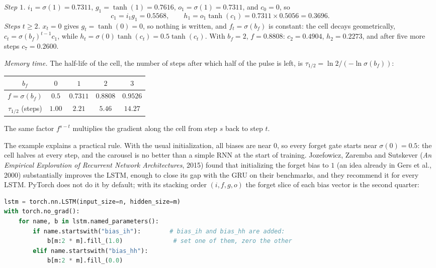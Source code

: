 \begin{notechapter}
\begin{example}
\emph{Step $1$.} $i_1 = \sigma(1) = 0.7311$, $g_1 = \tanh(1) = 0.7616$, $o_1 = \sigma(1) = 0.7311$, and $c_0 = 0$, so
\[
  c_1 = i_1g_1 = 0.5568,\qquad h_1 = o_1\tanh(c_1) = 0.7311\times0.5056 = 0.3696 .
\]
\emph{Steps $t\geq2$.} $x_t = 0$ gives $g_t = \tanh(0) = 0$, so nothing is written, and $f_t = \sigma(b_f)$ is constant: the cell
decays geometrically, $c_t = \sigma(b_f)^{t-1}c_1$, while $h_t = \sigma(0)\tanh(c_t) = 0.5\tanh(c_t)$. With $b_f = 2$, $f = 0.8808$:
$c_2 = 0.4904$, $h_2 = 0.2273$, and after five more steps $c_7 = 0.2600$.

\emph{Memory time.} The half-life of the cell, the number of steps after which half of the
pulse is left, is $\tau_{1/2} = \ln2/(-\ln\sigma(b_f))$:
\begin{center}
\begin{tabular}{c|cccc}
$b_f$ & $0$ & $1$ & $2$ & $3$\\\hline
$f = \sigma(b_f)$ & $0.5$ & $0.7311$ & $0.8808$ & $0.9526$\\
$\tau_{1/2}$ (steps) & $1.00$ & $2.21$ & $5.46$ & $14.27$
\end{tabular}
\end{center}
The same factor $f^{s-t}$ multiplies the gradient along the cell from step $s$ back to step $t$.
\end{example}

The example explains a practical rule. With the usual initialization, all biases are near $0$,
so every forget gate starts near $\sigma(0) = 0.5$: the cell halves at every step, and the
carousel is no better than a simple RNN at the start of training.
Jozefowicz, Zaremba and Sutskever (\emph{An Empirical Exploration of Recurrent Network
Architectures}, 2015) found that initializing the forget bias to $1$ (an idea already in
Gers et al., 2000) substantially improves the LSTM, enough to close its gap with the GRU on
their benchmarks, and they recommend it for every LSTM. PyTorch does not do it by default;
with its stacking order $(i, f, g, o)$ the forget slice of each bias vector is the second
quarter:
\begin{lstlisting}[language=Python]
lstm = torch.nn.LSTM(input_size=n, hidden_size=m)
with torch.no_grad():
    for name, b in lstm.named_parameters():
        if name.startswith("bias_ih"):        # bias_ih and bias_hh are added:
            b[m:2 * m].fill_(1.0)              # set one of them, zero the other
        elif name.startswith("bias_hh"):
            b[m:2 * m].fill_(0.0)
\end{lstlisting}


\end{notechapter}

